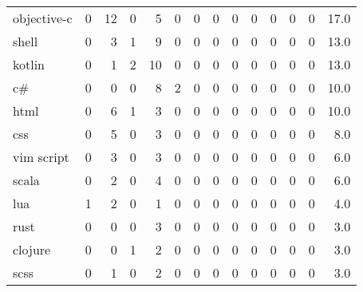 \begin{tabular}{lrrrrrrrrrrrrr}
objective-c   &        0 &      12 &          0 &               5 &                0 &       0 &          0 &         0 &         0 &      0 &             0 &         0 &     17.0 \\
shell         &        0 &       3 &          1 &               9 &                0 &       0 &          0 &         0 &         0 &      0 &             0 &         0 &     13.0 \\
kotlin        &        0 &       1 &          2 &              10 &                0 &       0 &          0 &         0 &         0 &      0 &             0 &         0 &     13.0 \\
c\#            &        0 &       0 &          0 &               8 &                2 &       0 &          0 &         0 &         0 &      0 &             0 &         0 &     10.0 \\
html          &        0 &       6 &          1 &               3 &                0 &       0 &          0 &         0 &         0 &      0 &             0 &         0 &     10.0 \\
css           &        0 &       5 &          0 &               3 &                0 &       0 &          0 &         0 &         0 &      0 &             0 &         0 &      8.0 \\
vim script    &        0 &       3 &          0 &               3 &                0 &       0 &          0 &         0 &         0 &      0 &             0 &         0 &      6.0 \\
scala         &        0 &       2 &          0 &               4 &                0 &       0 &          0 &         0 &         0 &      0 &             0 &         0 &      6.0 \\
lua           &        1 &       2 &          0 &               1 &                0 &       0 &          0 &         0 &         0 &      0 &             0 &         0 &      4.0 \\
rust          &        0 &       0 &          0 &               3 &                0 &       0 &          0 &         0 &         0 &      0 &             0 &         0 &      3.0 \\
clojure       &        0 &       0 &          1 &               2 &                0 &       0 &          0 &         0 &         0 &      0 &             0 &         0 &      3.0 \\
scss          &        0 &       1 &          0 &               2 &                0 &       0 &          0 &         0 &         0 &      0 &             0 &         0 &      3.0 \\

\end{tabular}
